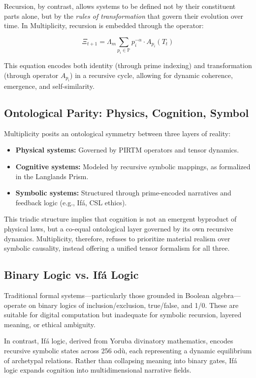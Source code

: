 \documentclass{article}
\theoremstyle{plain}
\begin{document}
Recursion, by contrast, allows systems to be defined not by their constituent parts alone, but by the \textit{rules of transformation} that govern their evolution over time. In Multiplicity, recursion is embedded through the operator:

\[
\Xi_{t+1} = \Lambda_m \sum_{p_i \in \mathbb{P}} p_i^{-\alpha} \cdot A_{p_i}(T_t)
\]

This equation encodes both identity (through prime indexing) and transformation (through operator \( A_{p_i} \)) in a recursive cycle, allowing for dynamic coherence, emergence, and self-similarity.

\subsection{Ontological Parity: Physics, Cognition, Symbol}

Multiplicity posits an ontological symmetry between three layers of reality:
\begin{itemize}
    \item \textbf{Physical systems:} Governed by PIRTM operators and tensor dynamics.
    \item \textbf{Cognitive systems:} Modeled by recursive symbolic mappings, as formalized in the Langlands Prism.
    \item \textbf{Symbolic systems:} Structured through prime-encoded narratives and feedback logic (e.g., Ifá, CSL ethics).
\end{itemize}

This triadic structure implies that cognition is not an emergent byproduct of physical laws, but a co-equal ontological layer governed by its own recursive dynamics. Multiplicity, therefore, refuses to prioritize material realism over symbolic causality, instead offering a unified tensor formalism for all three.

\subsection{Binary Logic vs. Ifá Logic}

Traditional formal systems—particularly those grounded in Boolean algebra—operate on binary logics of inclusion/exclusion, true/false, and 1/0. These are suitable for digital computation but inadequate for symbolic recursion, layered meaning, or ethical ambiguity.

In contrast, Ifá logic, derived from Yoruba divinatory mathematics, encodes recursive symbolic states across 256 odù, each representing a dynamic equilibrium of archetypal relations. Rather than collapsing meaning into binary gates, Ifá logic expands cognition into multidimensional narrative fields.
\end{document}
